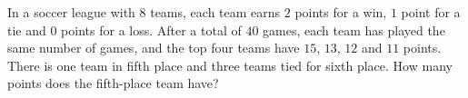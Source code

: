 In a soccer league with $8$ teams, each team earns $2$ points for a win, $1$ point for a tie and $0$ points for a loss. After a total of $40$ games, each team has played the same number of games, and the top four teams have $15$, $13$, $12$ and $11$ points. There is one team in fifth place and three teams tied for sixth place. How many points does the fifth-place team have?
